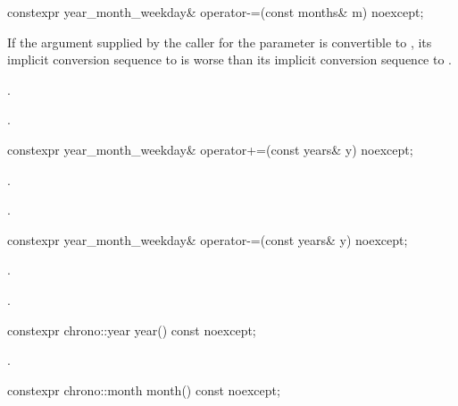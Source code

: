 %
\begin{itemdecl}
constexpr year_month_weekday& operator-=(const months& m) noexcept;
\end{itemdecl}

\begin{itemdescr}
\pnum
\constraints
If the argument supplied by the caller for the  parameter
is convertible to ,
its implicit conversion sequence to 
is worse than its implicit conversion sequence to
.

\pnum
\effects
{}.

\pnum
\returns
{}.
\end{itemdescr}

%
\begin{itemdecl}
constexpr year_month_weekday& operator+=(const years& y) noexcept;
\end{itemdecl}

\begin{itemdescr}
\pnum
\effects
{}.

\pnum
\returns
{}.
\end{itemdescr}

%
\begin{itemdecl}
constexpr year_month_weekday& operator-=(const years& y) noexcept;
\end{itemdecl}

\begin{itemdescr}
\pnum
\effects
{}.

\pnum
\returns
{}.
\end{itemdescr}

%
\begin{itemdecl}
constexpr chrono::year year() const noexcept;
\end{itemdecl}

\begin{itemdescr}
\pnum
\returns
{}.
\end{itemdescr}

%
\begin{itemdecl}
constexpr chrono::month month() const noexcept;
\end{itemdecl}

